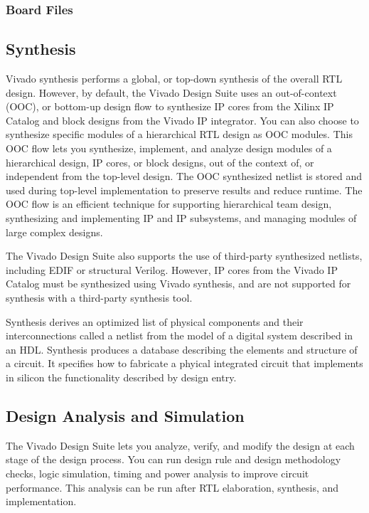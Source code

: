 \subsubsection{Board Files}

\subsection{Synthesis}
Vivado synthesis performs a global, or top-down synthesis of the overall RTL design.
However, by default, the Vivado Design Suite uses an out-of-context (OOC), or bottom-up design flow to synthesize IP cores from the Xilinx IP Catalog and block designs from the Vivado IP integrator. You can also choose to synthesize specific modules of a hierarchical RTL design as OOC modules. This OOC flow lets you synthesize, implement, and analyze design modules of a hierarchical design, IP cores, or block designs, out of the context of, or independent from the top-level design. The OOC synthesized netlist is stored and used during top-level implementation to preserve results and reduce runtime. The OOC flow is an efficient technique for supporting hierarchical team design, synthesizing and
implementing IP and IP subsystems, and managing modules of large complex designs.

The Vivado Design Suite also supports the use of third-party synthesized netlists, including EDIF or structural Verilog. However, IP cores from the Vivado IP Catalog must be synthesized using Vivado synthesis, and are not supported for synthesis with a third-party synthesis tool.

Synthesis derives an optimized list of physical components and their interconnections called a netlist from the model of a digital system described in an HDL. Synthesis produces a database describing the elements and structure of a circuit. It specifies how to fabricate a phyical integrated circuit that implements in silicon the functionality described by design entry.

\subsection{Design Analysis and Simulation}
The Vivado Design Suite lets you analyze, verify, and modify the design at each stage of the design process. You can run design rule and design methodology checks, logic simulation, timing and power analysis to improve circuit performance. This analysis can be run after RTL elaboration, synthesis, and implementation. 

